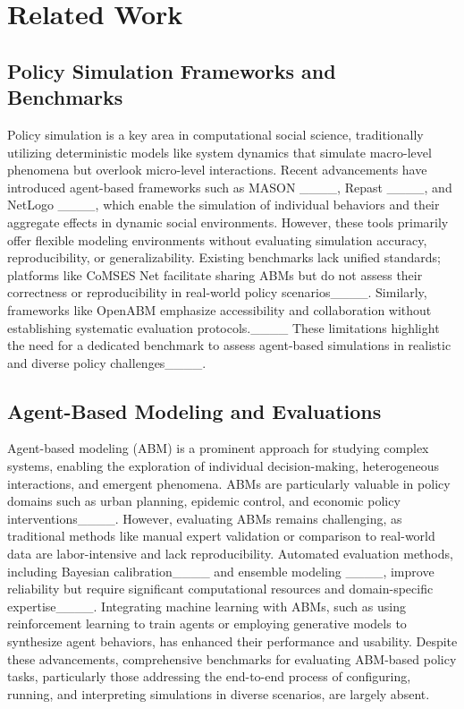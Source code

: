 \section{Related Work}
\subsection{Policy Simulation Frameworks and Benchmarks}

Policy simulation is a key area in computational social science, traditionally utilizing deterministic models like system dynamics that simulate macro-level phenomena but overlook micro-level interactions. Recent advancements have introduced agent-based frameworks such as MASON ____, Repast ____, and NetLogo ____, which enable the simulation of individual behaviors and their aggregate effects in dynamic social environments. However, these tools primarily offer flexible modeling environments without evaluating simulation accuracy, reproducibility, or generalizability. Existing benchmarks lack unified standards; platforms like CoMSES Net facilitate sharing ABMs but do not assess their correctness or reproducibility in real-world policy scenarios____. Similarly, frameworks like OpenABM emphasize accessibility and collaboration without establishing systematic evaluation protocols.____ These limitations highlight the need for a dedicated benchmark to assess agent-based simulations in realistic and diverse policy challenges____.

\subsection{Agent-Based Modeling and Evaluations}

Agent-based modeling (ABM) is a prominent approach for studying complex systems, enabling the exploration of individual decision-making, heterogeneous interactions, and emergent phenomena. ABMs are particularly valuable in policy domains such as urban planning, epidemic control, and economic policy interventions____. However, evaluating ABMs remains challenging, as traditional methods like manual expert validation or comparison to real-world data are labor-intensive and lack reproducibility. Automated evaluation methods, including Bayesian calibration____ and ensemble modeling ____, improve reliability but require significant computational resources and domain-specific expertise____. Integrating machine learning with ABMs, such as using reinforcement learning to train agents or employing generative models to synthesize agent behaviors, has enhanced their performance and usability. Despite these advancements, comprehensive benchmarks for evaluating ABM-based policy tasks, particularly those addressing the end-to-end process of configuring, running, and interpreting simulations in diverse scenarios, are largely absent.